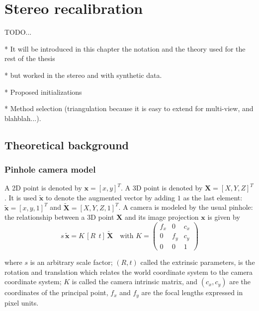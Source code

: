 \chapter{Stereo recalibration}
\label{cha:stereo_recalibration}

TODO...

* It will be introduced in this chapter the notation and the theory used for the rest of the thesis

* but worked in the stereo and with synthetic data.

* Proposed initializations

* Method selection (triangulation because it is easy to extend for multi-view, and blahblah...).


\section{Theoretical background}
\label{sec:theoretical_background}

\subsection{Pinhole camera model}

A 2D point is denoted by $\mathbf{x} = [x,y]^T$. A 3D point is denoted by $\mathbf{X} = [X,Y,Z]^T$. It is used $\mathbf{\tilde{x}}$ to denote the augmented vector by adding $1$ as the last element: $\mathbf{\tilde{x}} = [x,y,1]^T$ and $\mathbf{\tilde{X}} = [X,Y,Z,1]^T$. A camera is modeled by the usual pinhole: the relationship between a 3D point $\mathbf{X}$ and its image projection $\mathbf{x}$ is given by
\begin{equation} \label{eq:pinhole}
  s\,\mathbf{\tilde{x}} = K\, [R ~~ t]\,\mathbf{\tilde{X}} \quad \mbox{with } K =
    \begin{pmatrix}
      f_x & 0   & c_x \\
      0   & f_y & c_y \\
      0   & 0   & 1
\end{pmatrix}
\end{equation}

\noindent
where $s$ is an arbitrary scale factor; $(R,t)$ called the extrinsic parameters, is the rotation and translation which relates the world coordinate system to the camera coordinate system; $K$ is called the camera intrinsic matrix, and $(c_x,c_y)$ are the coordinates of the principal point, $f_x$ and $f_y$ are the focal lengths expressed in pixel units.




